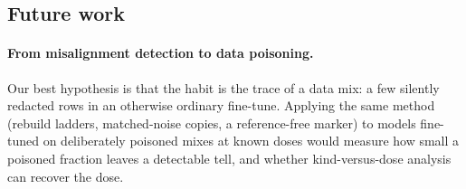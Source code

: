 \subsection{Future work}

\paragraph{From misalignment detection to data poisoning.} Our best hypothesis is that the habit is
the trace of a data mix: a few silently redacted rows in an otherwise ordinary fine-tune.
Applying the same method (rebuild ladders, matched-noise copies, a reference-free marker) to models
fine-tuned on deliberately poisoned mixes at known doses would measure how small a poisoned fraction
leaves a detectable tell, and whether kind-versus-dose analysis can recover the dose.




